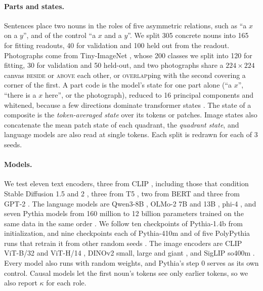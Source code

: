 \documentclass[10pt]{article}
\theoremstyle{plain}
\theoremstyle{remark}
\begin{document}
\paragraph{Parts and states.} Sentences place two nouns in the roles of five asymmetric relations, such as ``a $x$ on a $y$'', and of the control ``a $x$ and a $y$''. We split 305 concrete nouns into 165 for fitting readouts, 40 for validation and 100 held out from the readout. Photographs come from Tiny-ImageNet \citep{le2015tiny}, whose 200 classes we split into 120 for fitting, 30 for validation and 50 held-out, and two photographs share a $224 \times 224$ canvas \textsc{beside} or \textsc{above} each other, or \textsc{overlap}ping with the second covering a corner of the first. A part code is the model's state for one part alone (``a $x$'', ``there is a $x$ here'', or the photograph), reduced to 16 principal components and whitened, because a few directions dominate transformer states \citep{timkey2021}. The state of a composite is the \emph{token-averaged state} over its tokens or patches. Image states also concatenate the mean patch state of each quadrant, the \emph{quadrant state}, and language models are also read at single tokens. Each split is redrawn for each of 3 seeds.

\paragraph{Models.} We test eleven text encoders, three from CLIP \citep{radford2021clip}, including those that condition Stable Diffusion 1.5 and 2 \citep{rombach2022}, three from T5 \citep{raffel2020t5}, two from BERT \citep{devlin2019bert} and three from GPT-2 \citep{radford2019gpt2}. The language models are Qwen3-8B \citep{yang2025qwen3}, OLMo-2 7B and 13B \citep{olmo2024olmo2}, phi-4 \citep{abdin2024phi4}, and seven Pythia models from 160 million to 12 billion parameters trained on the same data in the same order \citep{biderman2023pythia}. We follow ten checkpoints of Pythia-1.4b from initialization, and nine checkpoints each of Pythia-410m and of five PolyPythia runs that retrain it from other random seeds \citep{vanderwal2025polypythias}. The image encoders are CLIP ViT-B/32 and ViT-H/14 \citep{radford2021clip,cherti2023}, DINOv2 small, large and giant \citep{oquab2024dinov2}, and SigLIP so400m \citep{zhai2023siglip}. Every model also runs with random weights, and Pythia's step 0 serves as its own control. Causal models let the first noun's tokens see only earlier tokens, so we also report $\kappa$ for each role.
\end{document}
